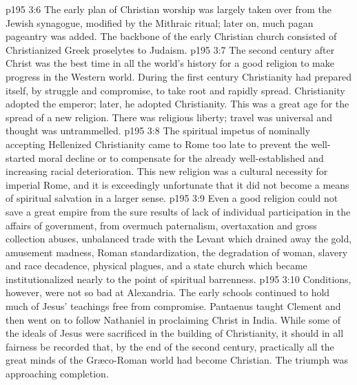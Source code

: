 \vs p195 3:6 \pc The early plan of Christian worship was largely taken over from the Jewish synagogue, modified by the Mithraic ritual; later on, much pagan pageantry was added. The backbone of the early Christian church consisted of Christianized Greek proselytes to Judaism.
\vs p195 3:7 \pc The second century after Christ was the best time in all the world’s history for a good religion to make progress in the Western world. During the first century Christianity had prepared itself, by struggle and compromise, to take root and rapidly spread. Christianity adopted the emperor; later, he adopted Christianity. This was a great age for the spread of a new religion. There was religious liberty; travel was universal and thought was untrammelled.
\vs p195 3:8 The spiritual impetus of nominally accepting Hellenized Christianity came to Rome too late to prevent the well\hyp{}started moral decline or to compensate for the already well\hyp{}established and increasing racial deterioration. This new religion was a cultural necessity for imperial Rome, and it is exceedingly unfortunate that it did not become a means of spiritual salvation in a larger sense.
\vs p195 3:9 Even a good religion could not save a great empire from the sure results of lack of individual participation in the affairs of government, from overmuch paternalism, overtaxation and gross collection abuses, unbalanced trade with the Levant which drained away the gold, amusement madness, Roman standardization, the degradation of woman, slavery and race decadence, physical plagues, and a state church which became institutionalized nearly to the point of spiritual barrenness.
\vs p195 3:10 Conditions, however, were not so bad at Alexandria. The early schools continued to hold much of Jesus’ teachings free from compromise. Pantaenus taught Clement and then went on to follow Nathaniel in proclaiming Christ in India. While some of the ideals of Jesus were sacrificed in the building of Christianity, it should in all fairness be recorded that, by the end of the second century, practically all the great minds of the Gr\ae co\hyp{}Roman world had become Christian. The triumph was approaching completion.
